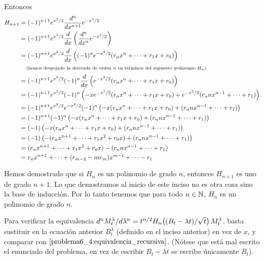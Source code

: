 Entonces
\scriptsize
\begin{align}
    H_{n+1} &=  (-1)^{n+1}  e^{x^2/2}   \frac{d^n}{dx^{n+1}}e^{-x^2/2}                                                                              \\
            &=  (-1)^{n+1}  e^{x^2/2}   \frac{d}{dx}\left(\frac{d^n}{dx^{n}}e^{-x^2/2}\right)                                                       \\
            &=  (-1)^{n+1}  e^{x^2/2}   \frac{d}{dx}\left((-1)^n e^{-x^2/2}(r_n x^n + \dots + r_1 x + r_0)\right)                                   \\
            &\;\;\;\;\mbox{{\scriptsize(hemos despejado la derivada de orden $n$ en terminos del supuesto polinomio $H_n$)}}                                            \\
            &=  (-1)^{n+1}  e^{x^2/2} (-1)^n \frac{d}{dx}\left(e^{-x^2/2}(r_n x^n + \dots + r_1 x + r_0)\right)                                     \\
            &=  (-1)^{n+1}  e^{x^2/2} (-1)^n \left(-x e^{-x^2/2}(r_n x^n + \dots + r_1 x + r_0) + e^{-x^2/2}(r_n n x^{n-1} + \dots + r_1)\right)    \\
            &=  (-1)^{n+1}  e^{x^2/2} e^{-x^2/2} (-1)^n \left(-x (r_n x^n + \dots + r_1 x + r_0) + (r_n n x^{n-1} + \dots + r_1)\right)             \\
            &=  (-1)^{n+1} (-1)^n \left(-x (r_n x^n + \dots + r_1 x + r_0) + (r_n n x^{n-1} + \dots + r_1)\right)                                   \\
            &=  (-1) \left(-x (r_n x^n + \dots + r_1 x + r_0) + (r_n n x^{n-1} + \dots + r_1)\right)                                                \\
            &=  (-1) \left(-(r_n x^{n+1} + \dots + r_1 x^2 + r_0 x) + (r_n n x^{n-1} + \dots + r_1)\right)                                          \\
            &=  (r_n x^{n+1} + \dots + r_1 x^2 + r_0 x) - (r_n n x^{n-1} + \dots + r_1)                                                             \\
            &=  r_n x^{n+1} + \dots + (r_{m-2} - m r_m) x^{m-1} + \dots - r_1                                                                       \\
\end{align}
\normalsize

Hemos demostrado que si $H_n$ es un polinomio de grado $n$, entonces $H_{n+1}$ es 
uno de grado $n+1$. Lo que demostramos al inicio de este inciso no es otra 
cosa sino la base de inducción. Por lo tanto tenemos que para todo $n \in \mathbb{N}$, 
$H_n$ es un polinomio de grado $n$.\pn

Para verificar la equivalencia $d^n M^\lambda_t/d \lambda^n=t^{n/2}H_n\!\left( (B_t - \lambda t)/\sqrt{t}\right) M^\lambda_t$, basta sustituir en la ecuación anterior
$B_t^\lambda$ (definido en el inciso anterior) en vez de $x$, y comparar con $\eqref{problema6_4:equivalencia_recursiva}$. (Nótese que está mal escrito
el enunciado del problema, en vez de escribir $B_t - \lambda t$ se escribe únicamente $B_t$).